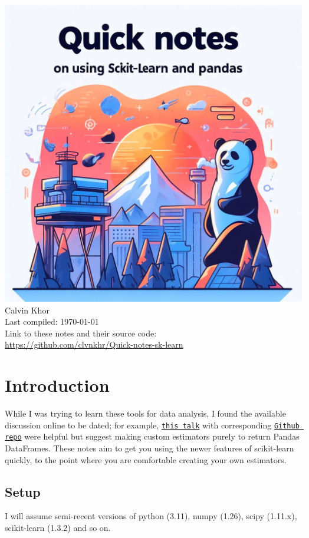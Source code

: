 \documentclass[11pt]{article}
\theoremstyle{definition}
\newcommand{\myhref}[2]{\href{#1}{\texttt{#2}}}
\begin{document}
\begin{center}
\includegraphics[scale=0.25]{banner.jpg}\\ 
{\Large Calvin Khor}\\  
Last compiled: \today\\ 
\footnotesize{Link to these notes and their source code: \\ \url{https://github.com/clvnkhr/Quick-notes-sk-learn}}
\end{center}
\tableofcontents

\section{Introduction}
While I was trying to learn these tools for data analysis, I found the available discussion online to be dated; for example, \myhref{https://www.youtube.com/watch?v=BFaadIqWlAg&list=PLzERW_Obpmv_t55kNFRet-E0h1nKeswWF&index=26}{this talk} with corresponding \myhref{https://github.com/jem1031/pandas-pipelines-custom-transformers}{Github repo} were helpful but suggest making custom estimators purely to return Pandas DataFrames. These notes aim to get you using the newer features of scikit-learn quickly, to the point where you are comfortable creating your own estimators.
\subsection{Setup}
I will assume semi-recent versions of python (3.11), numpy (1.26), scipy (1.11.x), scikit-learn (1.3.2) and so on.
\end{document}
